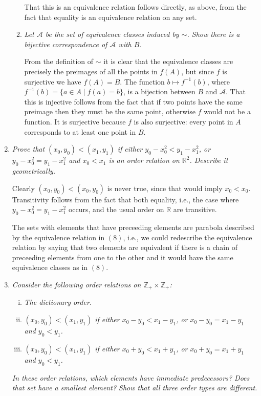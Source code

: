 \documentclass[letterpaper, 11pt]{article}
\newcommand{\Z}{\mathbb{Z}}
\newcommand{\R}{\mathbb{R}}
\begin{document}
\begin{enumerate}
\begin{enumerate}
That this is an equivalence relation follows directly, as above, from the fact that equality is an equivalence relation on any set.

\item \emph{Let $\mathcal{A}$ be the set of equivalence classes induced by $\sim$.  Show there is a bijective correspondence of $\mathcal{A}$ with $B$.}

From the definition of $\sim$ it is clear that the equivalence classes are precisely the preimages of all the points in $f(A)$, but since $f$ is surjective we have $f(A) = B$.  The function $b \mapsto f^{-1}(b)$, where $f^{-1}(b) = \{a \in A \mid f(a)=b\}$, is a bijection between $B$ and $\mathcal{A}$.  That this is injective follows from the fact that if two points have the same preimage then they must be the same point, otherwise $f$ would not be a function.  It is surjective because $f$ is also surjective: every point in $A$ corresponds to at least one point in $B$.

\end{enumerate}

\item \emph{Prove that $(x_0,y_0) < (x_1,y_1)$ if either $y_0 - x_0^2 < y_1 - x_1^2$, or $y_0 - x_0^2 = y_1 - x_1^2$ and $x_0 < x_1$ is an order relation on $\R^2$.  Describe it geometrically.}

Clearly $(x_0, y_0) < (x_0, y_0)$ is never true, since that would imply $x_0 < x_0$.  Transitivity follows from the fact that both equality, i.e., the case where $y_0 - x_0^2 = y_1 - x_1^2$ occurs, and the usual order on $\R$ are transitive.

The sets with elements that have preceeding elements are parabola described by the equivalence relation in $(8)$, i.e., we could redescribe the equivalence relation by saying that two elements are equivalent if there is a chain of preceeding elements from one to the other and it would have the same equivalence classes as in $(8)$.

\item \emph{Consider the following order relations on $\Z_+ \times \Z_+$:}
\begin{enumerate}[(i)]
\item \emph{The dictionary order.}
\item \emph{$(x_0, y_0) < (x_1,y_1)$ if either $x_0 - y_0 < x_1 - y_1$, or $x_0 - y_0 = x_1 - y_1$ and $y_0 < y_1$.}
\item \emph{$(x_0, y_0) < (x_1,y_1)$ if either $x_0 + y_0 < x_1 + y_1$, or $x_0 + y_0 = x_1 + y_1$ and $y_0 < y_1$.}
\end{enumerate}
\emph{In these order relations, which elements have immediate predecessors?  Does that set have a smallest element?  Show that all three order types are different.}


\end{enumerate}
\end{document}
